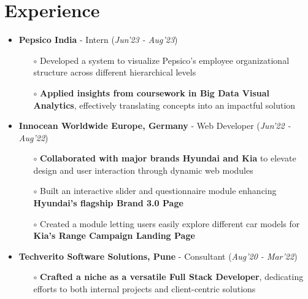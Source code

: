 \documentclass[10.8pt, a4paper]{extarticle}
\newcommand{\shorterSection}[1]{\vspace{-10pt}\section{#1}}
\begin{document}
\shorterSection{Experience}
\vspace{-2pt}
\begin{itemize}
    \item \textbf{Pepsico India} - Intern
    \hfill\hfill(\textit{Jun'23 - Aug'23})
    \begin{itemize}
          \item[$\circ$] Developed a system to visualize Pepsico's employee organizational structure across different hierarchical levels\\[-0.6cm]
          \item[$\circ$] \textbf{Applied insights from coursework in Big Data Visual Analytics}, effectively translating concepts into an impactful solution\\[-0.6cm]
    \end{itemize}
    \vspace{0.055cm}
    \item \textbf{Innocean Worldwide Europe, Germany} - Web Developer
    \hfill\hfill(\textit{Jun'22 - Aug'22})
    \begin{itemize}
          \item[$\circ$] \textbf{Collaborated with major brands Hyundai and Kia} to elevate design and user interaction through dynamic web modules \\[-0.6cm]
          \item[$\circ$] Built an interactive slider and questionnaire module enhancing \textbf{Hyundai's flagship Brand 3.0 Page}\\[-0.6cm]
          \item[$\circ$] Created a module letting users easily explore different car models for \textbf{Kia's Range Campaign Landing Page}\\[-0.6cm]
    \end{itemize}
    \vspace{0.055cm}
    \item \textbf{Techverito Software Solutions, Pune} - Consultant
    \hfill\hfill(\textit{Aug'20 - Mar'22})
    \begin{itemize}
          \item[$\circ$] \textbf{Crafted a niche as a versatile Full Stack Developer}, dedicating efforts to both internal projects and client-centric solutions \\[-0.6cm]

\end{itemize}
\end{itemize}
\end{document}
